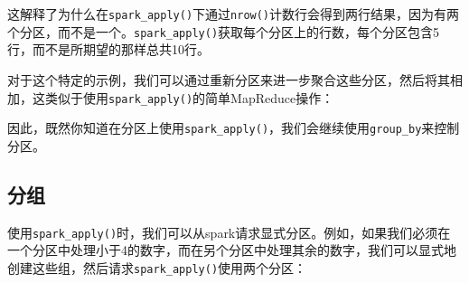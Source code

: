 \documentclass[
]{article}
\newenvironment{Shaded}{\begin{snugshade}}{\end{snugshade}}
\newcommand{\CommentTok}[1]{\textcolor[rgb]{0.56,0.35,0.01}{\textit{#1}}}
\newcommand{\DataTypeTok}[1]{\textcolor[rgb]{0.13,0.29,0.53}{#1}}
\newcommand{\DecValTok}[1]{\textcolor[rgb]{0.00,0.00,0.81}{#1}}
\newcommand{\ErrorTok}[1]{\textcolor[rgb]{0.64,0.00,0.00}{\textbf{#1}}}
\newcommand{\KeywordTok}[1]{\textcolor[rgb]{0.13,0.29,0.53}{\textbf{#1}}}
\newcommand{\NormalTok}[1]{#1}
\newcommand{\OperatorTok}[1]{\textcolor[rgb]{0.81,0.36,0.00}{\textbf{#1}}}
\newcommand{\OtherTok}[1]{\textcolor[rgb]{0.56,0.35,0.01}{#1}}
\newcommand{\StringTok}[1]{\textcolor[rgb]{0.31,0.60,0.02}{#1}}
\begin{document}
\begin{Shaded}
\end{Shaded}

这解释了为什么在\texttt{spark\_apply()}下通过\texttt{nrow()}计数行会得到两行结果，因为有两个分区，而不是一个。\texttt{spark\_apply()}获取每个分区上的行数，每个分区包含5行，而不是所期望的那样总共10行。

对于这个特定的示例，我们可以通过重新分区来进一步聚合这些分区，然后将其相加，这类似于使用\texttt{spark\_apply()}的简单MapReduce操作：

\begin{Shaded}
\end{Shaded}

因此，既然你知道在分区上使用\texttt{spark\_apply()}，我们会继续使用\texttt{group\_by}来控制分区。

\hypertarget{ux5206ux7ec4}{%
\subsection{分组}\label{ux5206ux7ec4}}

使用\texttt{spark\_apply()}时，我们可以从spark请求显式分区。例如，如果我们必须在一个分区中处理小于4的数字，而在另个分区中处理其余的数字，我们可以显式地创建这些组，然后请求\texttt{spark\_apply()}使用两个分区：

\begin{Shaded}
\end{Shaded}
\end{document}
